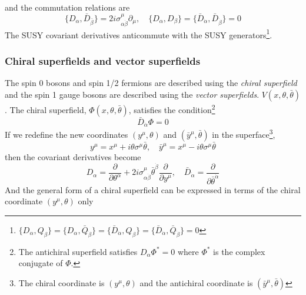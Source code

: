 %
and the commutation relations are
%
\begin{equation}
    \{D_{\alpha}, \bar{D}_{\bar{\beta}}\} = 2i \sigma^{\mu}_{\alpha \dot{\beta}} \partial_{\mu}, \quad
    \{D_{\alpha}, D_{\beta}\} = \{\bar{D}_{\dot{\alpha}}, \bar{D}_{\dot{\beta}}\} = 0
    \label{eq:susy_susy_covariant_derivatives_commutation_relations}
\end{equation}
%
The SUSY covariant derivatives anticommute with the SUSY generators\footnote{$\{D_{\alpha}, Q_{\beta}\} = \{D_{\alpha}, \bar{Q}_{\dot{\beta}}\}= \{\bar{D}_{\dot{\alpha}}, Q_{\beta}\} = \{\bar{D}_{\dot{\alpha}}, \bar{Q}_{\dot{\beta}}\} =0$}.


\subsubsection{Chiral superfields and vector superfields}
\label{subsec:susy_chiral_superfields_and_vector_superfields}
The spin 0 bosons and spin 1/2 fermions are described using the \textit{chiral superfield} and the spin 1 gauge bosons are described using the \textit{vector superfields}. $V(x, \theta, \bar{\theta})$.
The chiral superfield, $\Phi(x, \theta, \bar{\theta})$, satisfies the condition\footnote{The antichiral superfield satisfies $D_{\alpha}\Phi^{*} = 0$ where $\Phi^{*}$ is the complex conjugate of $\Phi$.}
%
\begin{equation}
    \bar{D}_{\dot{\alpha}} \Phi = 0
    \label{eq:susy_chiral_superfield_condition}
\end{equation}
%
If we redefine the new coordinates $(y^{\mu}, \theta)$ and $(\bar{y}^{\mu}, \bar{\theta})$ in the superface\footnote{The chiral coordinate is $(y^{\mu}, \theta)$ and the antichiral coordinate is $(\bar{y}^{\mu}, \bar{\theta})$},
%
\begin{equation}
    y^{\mu} = x^{\mu} + i \theta \sigma^{\mu} \bar{\theta}, \quad \bar{y}^{\mu} = x^{\mu} - i \theta \sigma^{\mu} \bar{\theta}
    \label{eq:susy_chiral_coordinate}
\end{equation}
%
then the covariant derivatives become
%
\begin{equation}
    D_{\alpha} = \frac{\partial}{\partial \theta^{\alpha}} + 2i \sigma^{\mu}_{\alpha \dot{\beta}} \bar{\theta}^{\dot{\beta}} \frac{\partial}{\partial y^{\mu}}, \quad \bar{D}_{\dot{\alpha}} = \frac{\partial}{\partial \bar{\theta}^{\dot{\alpha}}}
    \label{eq:susy_chiral_covariant_derivative}
\end{equation}
%
And the general form of a chiral superfield can be expressed in terms of the chiral coordinate $(y^{\mu}, \theta)$ only
